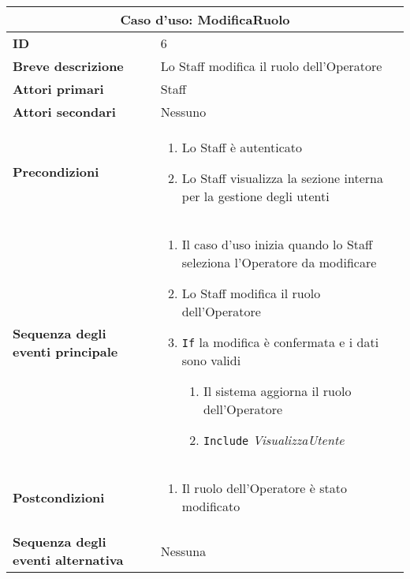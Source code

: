 \documentclass[a4paper]{report}
\begin{document}
\clearpage
\begin{table}[H]
\vspace*{-0cm}
\renewcommand{\arraystretch}{1.9}
\begin{tabular}{|p{3.9cm}|p{9.9cm}|}
\hline
\multicolumn{2}{|c|}{\textbf{Caso d’uso: ModificaRuolo}} \\ \hline
\textbf{ID} & 6 \\ \hline
\textbf{Breve descrizione} & Lo Staff modifica il ruolo dell’Operatore\\ \hline
\textbf{Attori primari} & Staff \\ \hline
\textbf{Attori secondari} & Nessuno \\ \hline
\textbf{Precondizioni} & \begin{enumerate}[leftmargin=14pt,label=\arabic*.,labelsep=0.5em,topsep=0pt,partopsep=0pt,parsep=0pt,itemsep=0pt]
    \item Lo Staff è autenticato
    \item Lo Staff visualizza la sezione interna per la gestione degli utenti
\end{enumerate} \\ \hline
\textbf{Sequenza degli eventi principale} &
\begin{enumerate}[leftmargin=14pt,label=\arabic*.,labelsep=0.5em,topsep=0pt,partopsep=0pt,parsep=0pt,itemsep=0pt]
    \item Il caso d’uso inizia quando lo Staff seleziona l’Operatore da modificare
    \item Lo Staff modifica il ruolo dell’Operatore
    \item \texttt{If} la modifica è confermata e i dati sono validi
    \begin{enumerate}[label=\arabic{enumi}.\arabic*.,leftmargin=22pt,labelsep=0.5em,topsep=0pt,partopsep=0pt,parsep=0pt,itemsep=0pt]
        \item Il sistema aggiorna il ruolo dell’Operatore
        \item \texttt{Include} \textit{VisualizzaUtente}
    \end{enumerate}
\end{enumerate}\\ \hline
\textbf{Postcondizioni} & \begin{enumerate}[leftmargin=14pt,label=\arabic*.,labelsep=0.5em,topsep=0pt,partopsep=0pt,parsep=0pt,itemsep=0pt]
    \item Il ruolo dell’Operatore è stato modificato
    \end{enumerate} \\ \hline
\textbf{Sequenza degli eventi alternativa} & Nessuna\\ \hline
\end{tabular}
\end{table}
\end{document}
